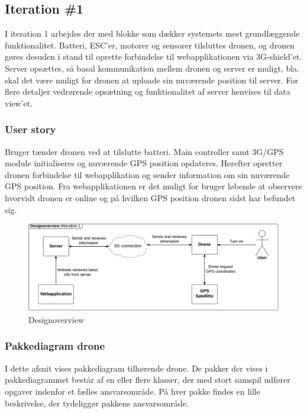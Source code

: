 \subsection{Iteration \#1}
\vspace{-0.6cm}
I iteration 1 arbejdes der med blokke som dækker systemets mest grundlæggende funktionalitet. Batteri, ESC’er, motorer og sensorer tilsluttes dronen, og dronen gøres desuden i stand til oprette forbindelse til webapplikationen via 3G-shield’et.
Server opsættes, så basal kommunikation mellem dronen og server er muligt, bla. skal det være muligt for dronen at uploade sin nuværende position til server. For flere detaljer vedrørende opsætning og funktionalitet af server henvises til data view'et. 

\subsubsection*{User story}
\vspace{-0.4cm}
Bruger tænder dronen ved at tilslutte batteri. Main controller samt 3G/GPS module initialiseres og nuværende GPS position opdateres. Herefter opretter dronen forbindelse til webapplikation og sender information om sin nuværende GPS position. Fra webapplikationen er det muligt for bruger løbende at observere hvorvidt dronen er online og på hvilken GPS position dronen sidst har befundet sig.

\begin{figure}[H]
	\centering
	\includegraphics[width=1\textwidth]{Billeder/design_overview/design_overview_iteration1.png}
	\vspace{-.7cm}
	\caption{Designoverview}
	\label{fig:design_overview_iteration_1}
\end{figure}


\newpage
\subsubsection*{Pakkediagram drone}

I dette afsnit vises pakkediagram tilhørende drone. De pakker der vises i pakkediagrammet består af en eller flere klasser, der med stort samspil udfører opgaver indenfor et fælles ansvarsområde. På hver pakke findes en lille beskrivelse, der tydeliggør pakkens ansvarsområde. 


